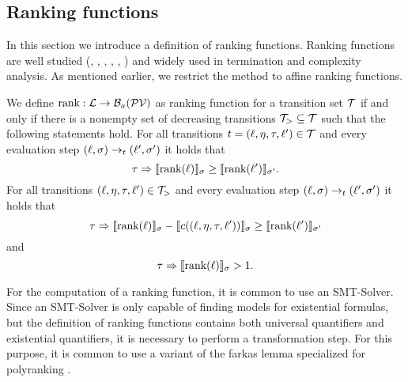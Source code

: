 \subsection{Ranking functions}

In this section we introduce a definition of ranking functions.
Ranking functions are well studied (\cite{bradley2005polyranking}, \cite{podelski2004prf}, \cite{bradley2005linear}, \cite{bagnara2012new}, \cite{leike2014ranking}, \cite{ben2013linear}) and widely used in termination and complexity analysis.
As mentioned earlier, we restrict the method to affine ranking functions.

\begin{definition} 
	We define $\text{rank}: \mathcal{L} \rightarrow \mathcal{B}_a(\mathcal{PV})$ as ranking function for a transition set $\mathcal{T}$ if and only if there is a nonempty set of decreasing transitions $\mathcal{T}_{>} \subseteq \mathcal{T}$ such that the following statements hold.
        For all transitions $t = (\ell, \eta, \tau, \ell') \in \mathcal{T}$ and every evaluation step $(\ell, \sigma) \rightarrow_t (\ell', \sigma')$ it holds that
	\[ \tau \Rightarrow \llbracket \text{rank}(\ell) \rrbracket_{\sigma} \geq \llbracket \text{rank}(\ell') \rrbracket_{\sigma'}. \]
        For all transitions $(\ell, \eta, \tau, \ell') \in \mathcal{T}_{>}$ and every evaluation step $(\ell, \sigma) \rightarrow_t (\ell', \sigma')$ it holds that        
	\[ \tau \Rightarrow \llbracket \text{rank}(\ell) \rrbracket_{\sigma} - \llbracket c((\ell, \eta, \tau, \ell')) \rrbracket_{\sigma} \geq \llbracket \text{rank}(\ell') \rrbracket_{\sigma'} \]
        and
	\[ \tau \Rightarrow \llbracket \text{rank}(\ell) \rrbracket_{\sigma} > 1. \]
\end{definition}


For the computation of a ranking function, it is common to use an SMT-Solver.
Since an SMT-Solver is only capable of finding models for existential formulas, but the definition of ranking functions contains both universal quantifiers and existential quantifiers, it is necessary to perform a transformation step.
For this purpose, it is common to use a variant of the farkas lemma \cite{schrijver1998theory} specialized for polyranking \cite{bradley2005polyranking}.

